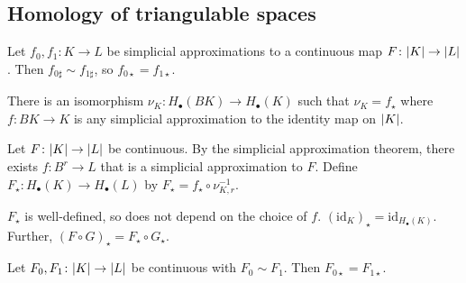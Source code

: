 \subsection{Homology of triangulable spaces}
\begin{theorem}
	Let \( f_0, f_1 \colon K \to L \) be simplicial approximations to a continuous map \( F \colon \abs{K} \to \abs{L} \).
	Then \( f_{0\sharp} \sim f_{1\sharp} \), so \( f_{0\star} = f_{1\star} \).
\end{theorem}
\begin{theorem}
	There is an isomorphism \( \nu_K \colon H_\bullet(B K) \to H_\bullet(K) \) such that \( \nu_K = f_\star \) where \( f \colon B K \to K \) is any simplicial approximation to the identity map on \( \abs{K} \).
\end{theorem}
\begin{definition}
	Let \( F \colon \abs{K} \to \abs{L} \) be continuous.
	By the simplicial approximation theorem, there exists \( f \colon B^r \to L \) that is a simplicial approximation to \( F \).
	Define \( F_\star \colon H_\bullet(K) \to H_\bullet(L) \) by \( F_\star = f_\star \circ \nu_{K,r}^{-1} \).
\end{definition}
\begin{theorem}
	\( F_\star \) is well-defined, so does not depend on the choice of \( f \).
	\( (\mathrm{id}_K)_\star = \mathrm{id}_{H_\bullet(K)} \).
	Further, \( (F \circ G)_\star = F_\star \circ G_\star \).
\end{theorem}
\begin{theorem}
	Let \( F_0, F_1 \colon \abs{K} \to \abs{L} \) be continuous with \( F_0 \sim F_1 \).
	Then \( F_{0\star} = F_{1\star} \).
\end{theorem}
